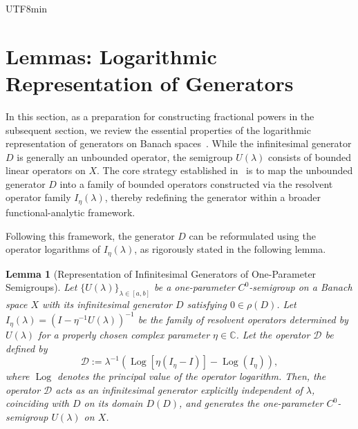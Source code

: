 \documentclass[10pt,a4paper]{article}
\newtheorem{lemma}[theorem]{Lemma}
\theoremstyle{definition}
\theoremstyle{remark}
\begin{document}
\begin{CJK}{UTF8}{min}
\section{Lemmas: Logarithmic Representation of Generators}
In this section, as a preparation for constructing fractional powers in the subsequent section, we review the essential properties of the logarithmic representation of generators on Banach spaces~\cite{20iwata, 23iwata}.
While the infinitesimal generator $D$ is generally an unbounded operator, the semigroup $U(\lambda)$ consists of bounded linear operators on $X$.
The core strategy established in~\cite{20iwata, 23iwata} is to map the unbounded generator $D$ into a family of bounded operators constructed via the resolvent operator family $I_{\eta}(\lambda)$, thereby redefining the generator within a broader functional-analytic framework.

Following this framework, the generator $D$ can be reformulated using the operator logarithms of $I_{\eta}(\lambda)$, as rigorously stated in the following lemma.

\begin{lemma}[Representation of Infinitesimal Generators of One-Parameter Semigroups] \label{lem03}
Let $\{U(\lambda)\}_{\lambda \in [a, b]}$ be a one-parameter $C^0$-semigroup on a Banach space $X$ with its infinitesimal generator $D$ satisfying $0 \in \rho(D)$. 
Let $I_{\eta}(\lambda) = (I - \eta^{-1}U(\lambda))^{-1}$ be the family of resolvent operators determined by $U(\lambda)$ for a properly chosen complex parameter $\eta \in \mathbb{C}$. 
Let the operator $\mathcal{D}$ be defined by
\begin{equation} \label{eq-simp01}
\mathcal{D} := \lambda^{-1} \left( \operatorname{Log}[\eta(I_{\eta}-I)] - \operatorname{Log}(I_{\eta}) \right),
\end{equation}
where $\operatorname{Log}$ denotes the principal value of the operator logarithm. 
Then, the operator $\mathcal{D}$ acts as an infinitesimal generator explicitly independent of $\lambda$, coinciding with $D$ on its domain $D(D)$, and generates the one-parameter $C^0$-semigroup $U(\lambda)$ on $X$.
\end{lemma}


\end{CJK}
\end{document}

